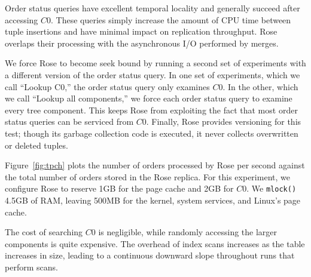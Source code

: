 \documentclass{vldb}
\newcommand{\rows}{Rose\xspace}
\newcommand{\rowss}{Rose's\xspace}
\begin{document}
Order status queries have excellent temporal locality and generally
succeed after accessing $C0$.  These queries simply increase the
amount of CPU time between tuple insertions and have minimal impact on
replication throughput.  \rows overlaps their processing with the
asynchronous I/O performed by merges.

We force \rows to become seek bound by running a second set of
experiments with a different version of the order status query.  In one set
of experiments, which we call ``Lookup C0,'' the order status query
only examines $C0$.  In the other, which we call ``Lookup all
components,'' we force each order status query to examine every tree
component.  This keeps \rows from exploiting the fact that most order
status queries can be serviced from $C0$.  Finally, \rows provides
versioning for this test; though its garbage collection code is
executed, it never collects overwritten or deleted tuples.


Figure~\ref{fig:tpch} plots the number of orders processed by \rows
per second against the total number of orders stored in the \rows
replica.  For this experiment, we configure \rows to reserve 1GB for
the page cache and 2GB for $C0$.  We {\tt mlock()} 4.5GB of RAM, leaving
500MB for the kernel, system services, and Linux's page cache.


The cost of searching $C0$ is negligible, while randomly
accessing the larger components is quite expensive.  The overhead of
index scans increases as the table increases in size, leading to a
continuous downward slope throughout runs that perform scans.
\end{document}

